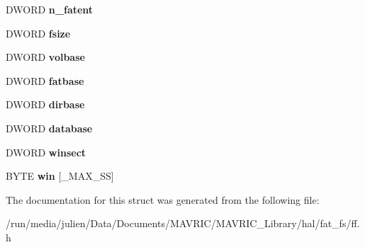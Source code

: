 \begin{DoxyCompactItemize}
\item 
\hypertarget{structFATFS_a8da50eeba6469bc20d60ca0cf9a1307c}{D\+W\+O\+R\+D {\bfseries n\+\_\+fatent}}\label{structFATFS_a8da50eeba6469bc20d60ca0cf9a1307c}

\item 
\hypertarget{structFATFS_a53e9560659f14e66f306c2c444198bf3}{D\+W\+O\+R\+D {\bfseries fsize}}\label{structFATFS_a53e9560659f14e66f306c2c444198bf3}

\item 
\hypertarget{structFATFS_a8f0ca578755749d204f59dc83f1a7649}{D\+W\+O\+R\+D {\bfseries volbase}}\label{structFATFS_a8f0ca578755749d204f59dc83f1a7649}

\item 
\hypertarget{structFATFS_a848fba02c4aabe02ef2984e578f33d64}{D\+W\+O\+R\+D {\bfseries fatbase}}\label{structFATFS_a848fba02c4aabe02ef2984e578f33d64}

\item 
\hypertarget{structFATFS_a3f72fd998dbcce4652a85a81fe944bc4}{D\+W\+O\+R\+D {\bfseries dirbase}}\label{structFATFS_a3f72fd998dbcce4652a85a81fe944bc4}

\item 
\hypertarget{structFATFS_a5b6c0bc2e9fd2ae8ef714210a74a2d5d}{D\+W\+O\+R\+D {\bfseries database}}\label{structFATFS_a5b6c0bc2e9fd2ae8ef714210a74a2d5d}

\item 
\hypertarget{structFATFS_ac60e69c00e6bf7c25febfbac4dc1476b}{D\+W\+O\+R\+D {\bfseries winsect}}\label{structFATFS_ac60e69c00e6bf7c25febfbac4dc1476b}

\item 
\hypertarget{structFATFS_a7cc35a593465e727ab87723c14610644}{B\+Y\+T\+E {\bfseries win} \mbox{[}\+\_\+\+M\+A\+X\+\_\+\+S\+S\mbox{]}}\label{structFATFS_a7cc35a593465e727ab87723c14610644}

\end{DoxyCompactItemize}


The documentation for this struct was generated from the following file\+:\begin{DoxyCompactItemize}
\item 
/run/media/julien/\+Data/\+Documents/\+M\+A\+V\+R\+I\+C/\+M\+A\+V\+R\+I\+C\+\_\+\+Library/hal/fat\+\_\+fs/ff.\+h\end{DoxyCompactItemize}
